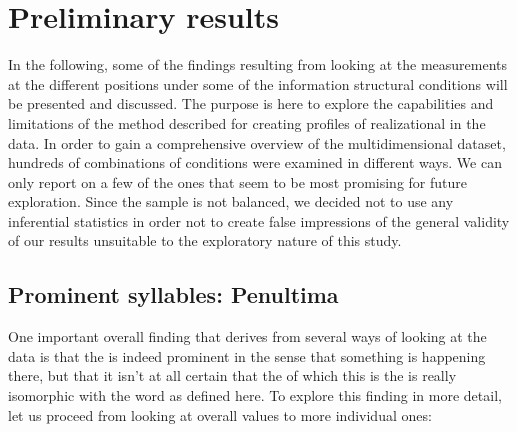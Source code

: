 \documentclass[output=paper]{LSP/langsci}
\begin{document}
\section{Preliminary results}
In the following, some of the findings resulting from looking at the measurements at the different  positions under some of the information structural conditions will be presented and discussed. The purpose is here to explore the capabilities and limitations of the method described for creating profiles of realizational  in the data. In order to gain a comprehensive overview of the multidimensional dataset, hundreds of combinations of conditions were examined in different ways. We can only report on a few of the ones that seem to be most promising for future exploration. Since the sample is not balanced, we decided not to use any inferential statistics in order not to create false impressions of the general validity of our results unsuitable to the exploratory nature of this study. 

\subsection{Prominent syllables: Penultima}
One important overall finding that derives from several ways of looking at the data is that the  is indeed prominent in the sense that something is happening there, but that it isn’t at all certain that the  of which this is the  is really isomorphic with the word as defined here. To explore this finding in more detail, let us proceed from looking at overall values to more individual ones:
\end{document}
